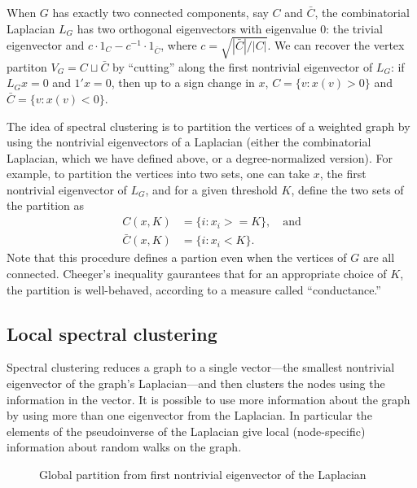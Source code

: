\documentclass[12pt]{article}
\theoremstyle{plain}
\begin{document}
When $G$ has exactly two connected components, say $C$ and $\bar C$,
the combinatorial Laplacian $L_G$ has two orthogonal eigenvectors
with eigenvalue $0$: the trivial eigenvector and
$c \cdot 1_C - c^{-1} \cdot 1_{\bar C}$, where
$c = \sqrt{|\bar C| / |C|}$.  We can recover the vertex partiton
$V_G = C \sqcup \bar C$ by ``cutting'' along the first nontrivial
eigenvector of $L_G$: if $L_G x = 0$ and $1' x = 0$, then up to a sign
change in $x$, $C = \{ v : x(v) > 0 \}$ and
$\bar C = \{ v : x(v) < 0 \}$.

The idea of spectral clustering is to partition the vertices of a
weighted graph by using the nontrivial eigenvectors of a Laplacian
(either the combinatorial Laplacian, which we have defined above, or a
degree-normalized version).  For example, to partition the vertices
into two sets, one can take $x$, the first nontrivial eigenvector of
$L_G$, and for a given threshold $K$, define the two sets of the partition as
\begin{align*}
  C(x,K)      &= \{ i : x_i >= K \}, \quad \text{and} \\
  \bar C(x,K) &= \{ i : x_i < K \}.
\end{align*}
Note that this procedure defines a partion even when the vertices of
$G$ are all connected.  Cheeger's inequality gaurantees that for an
appropriate choice of $K$, the partition is well-behaved, according to a
measure called ``conductance.''


\subsection{Local spectral clustering}

Spectral clustering reduces a graph to a single vector---the smallest
nontrivial eigenvector of the graph's Laplacian---and then clusters
the nodes using the information in the vector.
It is possible to use
more information about the graph by using more than one eigenvector
from the Laplacian.  In particular the elements of the pseudoinverse
of the Laplacian give local (node-specific) information about random
walks on the graph.

\begin{figure}
    \centering
    \caption{Global partition from first nontrivial eigenvector of the Laplacian}
\end{figure}
\end{document}
